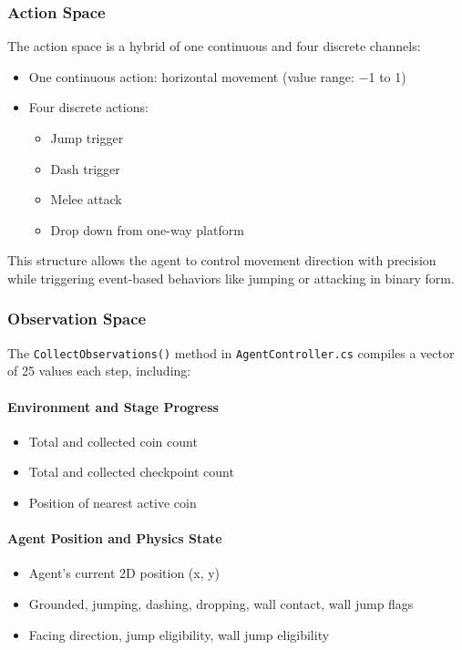 \documentclass[12pt,oneside,openright,a4paper]{cpe-english-project}
\begin{document}
\subsubsection{Action Space}

The action space is a hybrid of one continuous and four discrete channels:

\begin{itemize}
\item One continuous action: horizontal movement (value range: −1 to 1)
\item Four discrete actions:
\begin{itemize}
\item Jump trigger
\item Dash trigger
\item Melee attack
\item Drop down from one-way platform
\end{itemize}
\end{itemize}

This structure allows the agent to control movement direction with precision while triggering event-based behaviors like jumping or attacking in binary form.

\subsubsection{Observation Space}

The \texttt{CollectObservations()} method in \texttt{AgentController.cs} compiles a vector of 25 values each step, including:

\paragraph{Environment and Stage Progress}
\begin{itemize}
\item Total and collected coin count
\item Total and collected checkpoint count
\item Position of nearest active coin
\end{itemize}

\paragraph{Agent Position and Physics State}
\begin{itemize}
\item Agent’s current 2D position (x, y)
\item Grounded, jumping, dashing, dropping, wall contact, wall jump flags
\item Facing direction, jump eligibility, wall jump eligibility
\end{itemize}
\end{document}
